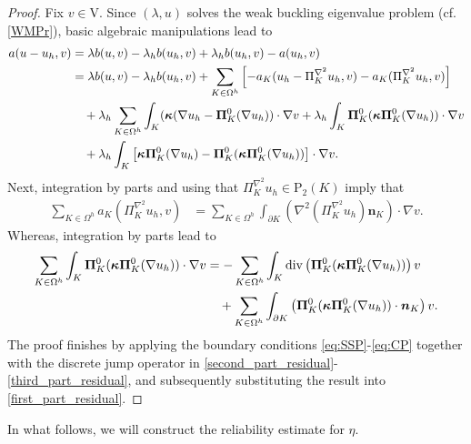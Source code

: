 \documentclass[final,reqno]{elsarticle}
\newcommand\vdiv{\mathop{\mathrm{div}}\nolimits}
\newcommand\rP{\mathrm{P}}
\def\bn{\boldsymbol{n}}
\def\bkappa{\boldsymbol{\kappa}}
\def\bPi{\mathbf{\Pi}}
\def\rP{\mathrm{P}}
\def\rV{\mathrm{V}}
\begin{document}
\begin{proof}
Fix $v\in \rV$. Since $(\lambda,u)$ solves the weak buckling eigenvalue problem (cf. \eqref{WMPr}), basic algebraic manipulations lead to
\begin{align} \label{first_part_residual}
a(u-u_h,v) &= \lambda b(u,v)-\lambda_h b(u_h,v) + \lambda_h b(u_h,v)-a(u_h,v) \notag\\
&= \lambda b(u,v)-\lambda_h b(u_h,v)  + \sum_{K\in \Omega^h} \left[-a_K (u_h-\Pi_K^{\nabla^2} u_h,v) -  a_K(\Pi_K^{\nabla^2} u_h,v)\right] \notag\\
& \quad + \lambda_h\sum_{K\in \Omega^h} \int_K (\bkappa(\nabla u_h - \bPi_K^0 (\nabla u_h))\cdot \nabla v + \lambda_h\int_K \bPi_K^0(\bkappa \bPi_K^0 (\nabla u_h))\cdot \nabla v \notag\\
& \quad +\lambda_h \int_K \left[\bkappa \bPi_K^0 (\nabla u_h)-\bPi_K^0(\bkappa \bPi_K^0 (\nabla u_h))\right]\cdot \nabla v.
\end{align}
Next, integration by parts and using that $\Pi_K^{\nabla^2} u_h\in \rP_2(K)$ imply that 
\begin{align}
    \sum_{K\in\Omega^h} a_K(\Pi_K^{\nabla^2} u_h,v) &= \sum\limits_{K\in \Omega^h} \int_{\partial K} \left(\nabla^2(\Pi_K^{\nabla^2} u_h)\bn_{K}\right)\cdot \nabla v. \label{second_part_residual}
    \end{align}
    Whereas, integration by parts lead to 
    \begin{align}        
    \sum_{K\in \Omega^h} \int_K \bPi_K^0(\bkappa \bPi_K^0 (\nabla u_h))\cdot \nabla v &= - \sum_{K\in \Omega^h} \int_K \vdiv\left(\bPi_K^0(\bkappa \bPi_K^0(\nabla u_h))\right) v \notag \\
    & \quad + \sum_{K\in\Omega^h} \int_{\partial K} \left(\bPi_K^0(\bkappa \bPi_K^0(\nabla u_h)) \cdot \bn_K\right) v. \label{third_part_residual}
\end{align}
The proof finishes by applying the boundary conditions \eqref{eq:SSP}-\eqref{eq:CP} together with the discrete jump operator in \eqref{second_part_residual}- \eqref{third_part_residual}, and subsequently substituting the result into \eqref{first_part_residual}.
\end{proof}

In what follows, we will construct the reliability estimate for $\eta$. 
\end{document}
